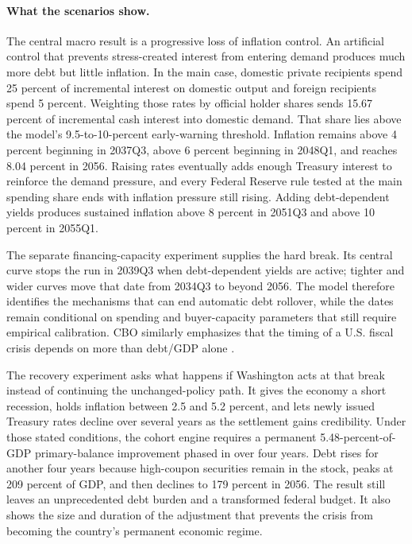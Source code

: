 \documentclass[11pt]{article}
\begin{document}
\paragraph{What the scenarios show.}
The central macro result is a progressive loss of inflation control.  An artificial control that prevents
stress-created interest from entering demand produces much more debt but little inflation.
In the main case, domestic private recipients spend 25 percent of incremental interest on
domestic output and foreign recipients spend 5 percent.  Weighting those rates by official
holder shares sends 15.67 percent of incremental cash interest into domestic demand.  That
share lies above the model's 9.5-to-10-percent early-warning threshold.  Inflation remains
above 4 percent beginning in 2037Q3, above 6 percent beginning in 2048Q1, and reaches 8.04
percent in 2056.  Raising rates eventually adds enough Treasury interest to reinforce the
demand pressure, and every Federal Reserve rule tested at the main spending share ends with
inflation pressure still rising.  Adding debt-dependent yields produces sustained inflation
above 8 percent in 2051Q3 and above 10 percent in 2055Q1.

The separate financing-capacity experiment supplies the hard break.  Its central curve stops
the run in 2039Q3 when debt-dependent yields are active; tighter and wider curves
move that date from 2034Q3 to beyond 2056.  The model therefore identifies the mechanisms
that can end automatic debt rollover, while the dates remain conditional on spending and
buyer-capacity parameters that still require empirical calibration.  CBO similarly emphasizes
that the timing of a U.S. fiscal crisis depends on more than debt/GDP alone \cite{cboCrisis}.

The recovery experiment asks what happens if Washington acts at that break instead of
continuing the unchanged-policy path.  It gives the economy a short recession, holds
inflation between 2.5 and 5.2 percent, and lets newly issued Treasury rates decline over
several years as the settlement gains credibility.  Under those stated conditions, the
cohort engine requires a permanent 5.48-percent-of-GDP primary-balance improvement phased in
over four years.  Debt rises for another four years because high-coupon securities remain in
the stock, peaks at 209 percent of GDP, and then declines to 179 percent in 2056.  The result
still leaves an unprecedented debt burden and a transformed federal budget.  It also shows
the size and duration of the adjustment that prevents the crisis from becoming the country's
permanent economic regime.
\end{document}
